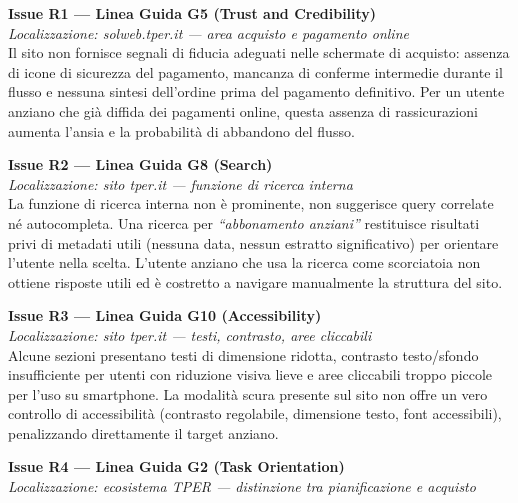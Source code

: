 \documentclass[11pt,a4paper]{article}
\begin{document}
\bigskip

\noindent\textbf{Issue R1 — Linea Guida G5 (Trust and Credibility)}\label{iss:R1}\\
\textit{Localizzazione: solweb.tper.it — area acquisto e pagamento online}\\

\noindent Il sito non fornisce segnali di fiducia adeguati nelle schermate di acquisto: assenza di icone di sicurezza del pagamento, mancanza di conferme intermedie durante il flusso e nessuna sintesi dell'ordine prima del pagamento definitivo. Per un utente anziano che già diffida dei pagamenti online, questa assenza di rassicurazioni aumenta l'ansia e la probabilità di abbandono del flusso.

\bigskip

\noindent\textbf{Issue R2 — Linea Guida G8 (Search)}\label{iss:R2}\\
\textit{Localizzazione: sito tper.it — funzione di ricerca interna}\\

\noindent La funzione di ricerca interna non è prominente, non suggerisce query correlate né autocompleta. Una ricerca per \textit{``abbonamento anziani''} restituisce risultati privi di metadati utili (nessuna data, nessun estratto significativo) per orientare l'utente nella scelta. L'utente anziano che usa la ricerca come scorciatoia non ottiene risposte utili ed è costretto a navigare manualmente la struttura del sito.

\bigskip

\noindent\textbf{Issue R3 — Linea Guida G10 (Accessibility)}\label{iss:R3}\\
\textit{Localizzazione: sito tper.it — testi, contrasto, aree cliccabili}\\

\noindent Alcune sezioni presentano testi di dimensione ridotta, contrasto testo/sfondo insufficiente per utenti con riduzione visiva lieve e aree cliccabili troppo piccole per l'uso su smartphone. La modalità scura presente sul sito non offre un vero controllo di accessibilità (contrasto regolabile, dimensione testo, font accessibili), penalizzando direttamente il target anziano.

\bigskip

\noindent\textbf{Issue R4 — Linea Guida G2 (Task Orientation)}\label{iss:R4}\\
\textit{Localizzazione: ecosistema TPER --- distinzione tra pianificazione
e acquisto}\\
\end{document}
